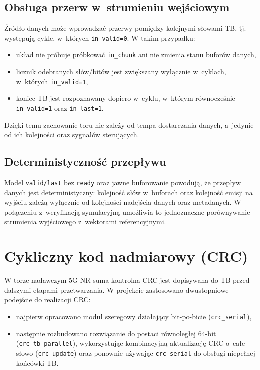 \subsection{Obsługa przerw w~strumieniu wejściowym}
Źródło danych może wprowadzać przerwy pomiędzy kolejnymi słowami TB, tj. występują cykle, w~których \texttt{in\_valid=0}. W takim przypadku:
\begin{itemize}
    \item układ nie próbuje próbkować \texttt{in\_chunk} ani nie zmienia stanu buforów danych,
    \item licznik odebranych słów/bitów jest zwiększany wyłącznie w~cyklach, w~których \texttt{in\_valid=1},
    \item koniec TB jest rozpoznawany dopiero w~cyklu, w~którym równocześnie \texttt{in\_valid=1} oraz \texttt{in\_last=1}.
\end{itemize}

Dzięki temu zachowanie toru nie zależy od tempa dostarczania danych, a~jedynie od ich kolejności oraz sygnałów sterujących.

\subsection{Deterministyczność przepływu}
Model \texttt{valid/last} bez \texttt{ready} oraz jawne buforowanie powodują, że przepływ danych jest deterministyczny: kolejność słów w~buforach oraz kolejność emisji na wyjściu zależą wyłącznie od kolejności nadejścia danych oraz metadanych. W połączeniu z~weryfikacją symulacyjną umożliwia to jednoznaczne porównywanie strumienia wyjściowego z~wektorami referencyjnymi.


\section{Cykliczny kod nadmiarowy (CRC)}
\label{sec:CRC}

W torze nadawczym 5G NR suma kontrolna CRC jest dopisywana do TB przed dalszymi etapami przetwarzania. W projekcie zastosowano dwustopniowe podejście do realizacji CRC:
\begin{itemize}
    \item najpierw opracowano moduł szeregowy działający bit-po-bicie (\texttt{crc\_serial}),
    \item następnie rozbudowano rozwiązanie do postaci równoległej 64-bit (\texttt{crc\_tb\_parallel}), wykorzystując kombinacyjną aktualizację CRC o~całe słowo (\texttt{crc\_update}) oraz ponownie używając \texttt{crc\_serial} do obsługi niepełnej końcówki TB.
\end{itemize}

